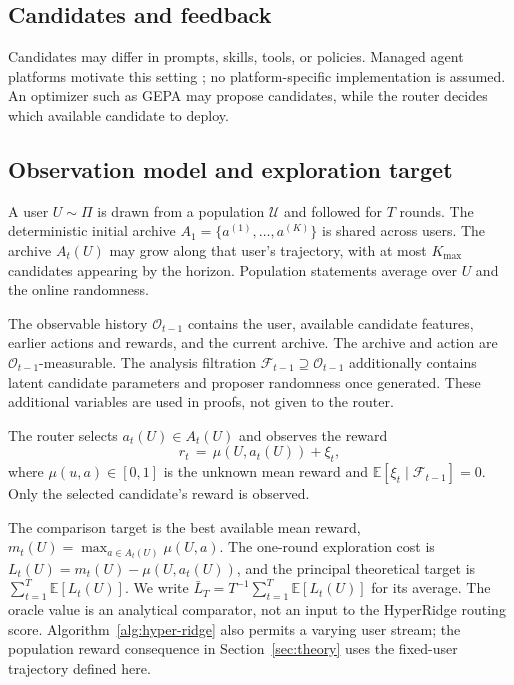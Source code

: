 \documentclass{article} %
\providecommand{\E}{\mathbb{E}}
\begin{document}
\subsection{Candidates and feedback}

\label{sec:method-plain}
Candidates may differ in prompts, skills, tools, or policies. Managed agent
platforms motivate this setting
\citep{microsoft2026foundryagents,aws2026agentcore}; no platform-specific
implementation is assumed. An optimizer such as GEPA
\citep{agrawal2025geparp} may propose candidates, while the router decides
which available candidate to deploy.

\subsection{Observation model and exploration target}

\label{sec:method-notation}
A user $U\sim\Pi$ is drawn from a population $\mathcal U$ and followed for
$T$ rounds. The deterministic initial archive
$A_1=\{a^{(1)},\ldots,a^{(K)}\}$ is shared across users. The archive
$A_t(U)$ may grow along that user's trajectory, with at most $K_{\max}$
candidates appearing by the horizon. Population statements average over
$U$ and the online randomness.

The observable history $\mathcal O_{t-1}$ contains the user, available
candidate features, earlier actions and rewards, and the current archive.
The archive and action are $\mathcal O_{t-1}$-measurable. The analysis
filtration $\mathcal F_{t-1}\supseteq\mathcal O_{t-1}$ additionally contains
latent candidate parameters and proposer randomness once generated.
These additional variables are used in proofs, not given to the router.

The router selects $a_t(U) \in A_t(U)$ and observes the reward
\begin{equation}
r_t \,=\, \mu(U, a_t(U)) + \xi_t ,
\end{equation}
where $\mu(u,a)\in[0,1]$ is the unknown mean reward and
$\E[\xi_t\mid\mathcal F_{t-1}]=0$. Only the selected candidate's reward is
observed.

The comparison target is the best available mean reward,
$m_t(U)=\max_{a\in A_t(U)}\mu(U,a)$. The one-round exploration cost is
$L_t(U)=m_t(U)-\mu(U,a_t(U))$, and the principal theoretical target is
$\sum_{t=1}^T\E[L_t(U)]$. We write
$\bar L_T=T^{-1}\sum_{t=1}^T\E[L_t(U)]$ for its average.
The oracle value is an analytical comparator, not an input to the
HyperRidge routing score. Algorithm~\ref{alg:hyper-ridge} also permits a
varying user stream; the population reward consequence in
Section~\ref{sec:theory} uses the fixed-user trajectory defined here.
\end{document}
